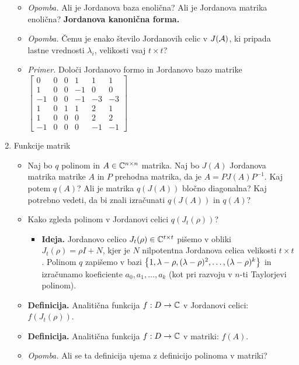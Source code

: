 \begin{enumerate}
\begin{itemize}
        \item \colorbox{yellow!30}{\emph{Opomba.}} Ali je Jordanova baza enolična? Ali je Jordanova matrika enolična? \textbf{Jordanova kanonična forma.}
        \item \colorbox{yellow!30}{\emph{Opomba.}} Čemu je enako število Jordanovih celic v $J(\mathcal{A})$, ki pripada lastne vrednosti $\lambda_i$, velikosti vsaj $t \times t$? 
        \item \colorbox{yellow!30}{\emph{Primer.}} Določi Jordanovo formo in Jordanovo bazo matrike $\begin{bmatrix}
            0 & 0 & 0 & 1 & 1 & 1 \\
            1 & 0 & 0 & -1 & 0 & 0 \\
            -1 & 0 & 0 & -1 & -3 & -3 \\
            1 & 0 & 1 & 1 & 2 & 1 \\
            1 & 0 & 0 & 0 & 2 & 2 \\
            -1 & 0 & 0 & 0 & -1 & -1
        \end{bmatrix}$
    \end{itemize}

    \newpage
    \item Funkcije matrik 
    \begin{itemize}
        \item Naj bo $q$ polinom in $A \in \mathbb{C}^{n \times n}$ matrika. Naj bo $J(A)$ Jordanova matrika matrike $A$ in $P$ prehodna matrika, da je $A = P J(A) P^{-1}$. Kaj potem $q(A)$? Ali je matrika $q(J(A))$ bločno diagonalna? Kaj potrebno vedeti, da bi znali izračunati $q(J(A))$ in $q(A)$?
        \item Kako zgleda polinom v Jordanovi celici $q(J_t(\rho))$?
        \begin{itemize}
            \item \colorbox{green!30}{\textbf{Ideja.}} Jordanovo celico $J_t(\rho) \in \mathbb{C}^{t \times t}$ pišemo v obliki $J_t(\rho) = \rho I + N$, kjer je $N$ nilpotentna Jordanova celica velikosti $t \times t$. Polinom $q$ zapišemo v bazi $\left\{1, \lambda - \rho, (\lambda - \rho)^2, \ldots, (\lambda - \rho)^k\right\}$ in izračunamo koeficiente $a_0, a_1, \ldots, a_k$ (kot pri razvoju v $n$-ti Taylorjevi polinom).
        \end{itemize}         
        \item \colorbox{purple!30}{\textbf{Definicija.}} Analitična funkcija $f: D \to \mathbb{C}$ v Jordanovi celici: $f(J_t(\rho))$.
        \item \colorbox{purple!30}{\textbf{Definicija.}} Analitična funkcija $f: D \to \mathbb{C}$ v matriki: $f(A)$.
        \item \colorbox{yellow!30}{\emph{Opomba.}} Ali se ta definicija ujema z definicijo polinoma v matriki? 
        

\end{itemize}
\end{enumerate}
